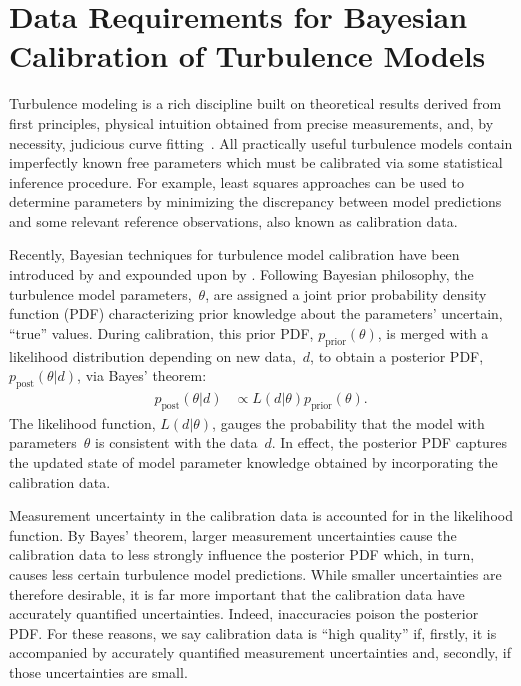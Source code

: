 \section[Data Requirements for Bayesian Calibration of Turbulence Models]
        {Data Requirements for Bayesian\\Calibration of Turbulence Models}
\label{sec:datareq}

Turbulence modeling is a rich discipline built on theoretical results derived
from first principles, physical intuition obtained from precise measurements,
and, by necessity, judicious curve fitting~\citep{Durbin2011Statistical,
Pope2000Turbulent, Chassaing2010Variable, Wilcox2006Turbulence}.  All
practically useful turbulence models contain imperfectly known free parameters
which must be calibrated via some statistical inference procedure.  For example,
least squares approaches can be used to determine parameters by minimizing the
discrepancy between model predictions and some relevant reference observations,
also known as calibration data.

Recently, Bayesian techniques for turbulence model calibration have been
introduced by \citet{RESS-2010} and expounded upon by \citeauthor{ETC13-2011}
\citep{ETC13-2011, Oliver2012Accounting}.  Following Bayesian philosophy, the
turbulence model parameters,~$\theta$, are assigned a joint prior probability
density function (PDF) characterizing prior knowledge about the
parameters' uncertain, ``true'' values.  During calibration, this prior PDF,
$p_\text{prior}\!\left(\theta\right)$, is merged with a likelihood distribution
depending on new data,~$d$, to obtain a posterior PDF,
$p_\text{post}\left(\theta{}|d\right)$, via Bayes' theorem:
\begin{align}
  p_\text{post}\!\left(\theta|d\right)
  &\propto
  L\!\left(d|\theta\right)
  p_\text{prior}\!\left(\theta\right).
\end{align}
The likelihood function, $L\!\left(d|\theta\right)$, gauges the probability
that the model with parameters~$\theta$ is consistent with the data~$d$.  In
effect, the posterior PDF captures the updated state of model parameter
knowledge obtained by incorporating the calibration data.

Measurement uncertainty in the calibration data is accounted for in the
likelihood function.  By Bayes' theorem, larger measurement uncertainties cause
the calibration data to less strongly influence the posterior PDF which, in
turn, causes less certain turbulence model predictions.  While smaller
uncertainties are therefore desirable, it is far more important that the
calibration data have accurately quantified uncertainties.  Indeed,
inaccuracies poison the posterior PDF.  For these reasons, we say calibration
data is ``high quality'' if, firstly, it is accompanied by accurately
quantified measurement uncertainties and, secondly, if those uncertainties are
small.

